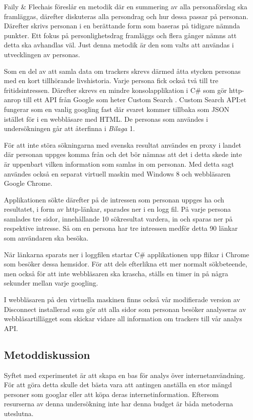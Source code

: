 \documentclass[a4paper,11pt]{article}
\begin{document}
{Faily \& Flechais \cite{Faily} föreslår en metodik där en summering av alla personaförslag ska framläggas, därefter diskuteras alla persondrag och hur dessa passar på personan. Därefter skrivs personan i en berättande form som baseras på tidigare nämnda punkter. Ett fokus på personlighetsdrag framläggs och flera gånger nämns att detta ska avhandlas väl. Just denna metodik är den som valts att användas i utvecklingen av personas. 

Som en del av att samla data om trackers skrevs därmed åtta stycken personas med en kort tillhörande livshistoria. Varje persona fick också två till tre fritidsintressen. Därefter skrevs en mindre konsolapplikation i C\# som gör http-anrop till ett API från Google som heter Custom Search \cite{CustomSearch}. Custom Search API:et fungerar som en vanlig googling fast där svaret kommer tillbaka som JSON istället för i en webbläsare med HTML. De personas som användes i undersökningen går att återfinna i \textit{Bilaga} 1.

För att inte störa sökningarna med svenska resultat användes en proxy i landet där personan uppges komma från och det bör nämnas att det i detta skede inte är uppenbart vilken information som samlas in om personan. Med detta sagt användes också en separat virtuell maskin med Windows 8 och webbläsaren Google Chrome. 

Applikationen sökte därefter på de intressen som personan uppges ha och resultatet, i form av http-länkar, sparades ner i en logg fil. På varje persona samlades tre sidor, innehållande 10 sökresultat vardera, in och sparas ner på respektive intresse. Så om en persona har tre intressen medför detta 90 länkar som användaren ska besöka. 

När länkarna sparats ner i loggfilen startar C\# applikationen upp flikar i Chrome som besöker dessa hemsidor. För att dels efterlikna ett mer normalt sökbeteende, men också för att inte webbläsaren ska krascha, ställs en timer in på några sekunder mellan varje googling. 

I webbläsaren på den virtuella maskinen finns också vår modifierade version av Disconnect installerad som gör att alla sidor som personan besöker analyseras av webbläsartillägget som skickar vidare all information om trackers till vår analys API. 

\subsection{Metoddiskussion}
Syftet med experimentet är att skapa en bas för analys över internetanvändning. För att göra detta skulle det bästa vara att antingen anställa en stor mängd personer som googlar eller att köpa deras internetinformation. Eftersom resurserna av denna undersökning inte har denna budget är båda metoderna uteslutna. 

}
\end{document}
